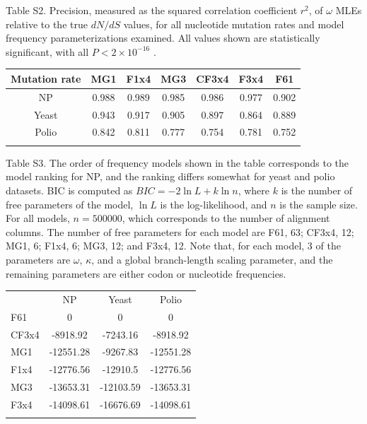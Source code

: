 \documentclass[11pt]{article}
\begin{document}
\noindent Table S2. Precision, measured as the squared correlation coefficient $r^2$, of $\omega$ MLEs relative to the true $dN/dS$ values, for all nucleotide mutation rates and model frequency parameterizations examined. All values shown are statistically significant, with all $P < 2\times10^{-16}$ .
\begin{table}[htbp]
	\begin{tabular}{c c c c c c c}
		\hline\noalign{\smallskip}
		Mutation rate & MG1 & F1x4 & MG3 & CF3x4 & F3x4 & F61 \\
		\hline\noalign{\smallskip}
		NP & 0.988 & 0.989 & 0.985 & 0.986 & 0.977 & 0.902 \\ 
		Yeast & 0.943 & 0.917 & 0.905 & 0.897 & 0.864 & 0.889 \\ 
		Polio & 0.842 & 0.811 & 0.777 & 0.754 & 0.781 & 0.752 \\ 
		\noalign{\smallskip}\hline\noalign{\smallskip}
	\end{tabular}
\end{table}	

\vspace{2.5cm}


\noindent Table S3. The order of frequency models shown in the table corresponds to the model ranking for NP, and the ranking differs somewhat for yeast and polio datasets. BIC is computed as $BIC = -2\ln L + k\ln n$, where $k$ is the number of free parameters of the model, $\ln L$ is the log-likelihood, and $n$ is the sample size. For all models, $n=500000$, which corresponds to the number of alignment columns. The number of free parameters for each model are F61, 63; CF3x4, 12; MG1, 6; F1x4, 6; MG3, 12; and F3x4, 12. Note that, for each model, 3 of the parameters are $\omega$, $\kappa$, and a global branch-length scaling parameter, and the remaining parameters are either codon or nucleotide frequencies.
\begin{table}[htbp]
	\begin{tabular}{l c c c}
		\hline\noalign{\smallskip}
		\multicolumn{1}{c}{Frequencies} & NP & Yeast & Polio \\
		\noalign{\smallskip}\hline\noalign{\smallskip}
		F61 & 0 & 0 & 0 \\ 
		CF3x4 & -8918.92 & -7243.16 & -8918.92 \\ 
		MG1 & -12551.28 & -9267.83 & -12551.28 \\ 
		F1x4 & -12776.56 & -12910.5 & -12776.56 \\ 
		MG3 & -13653.31 & -12103.59 & -13653.31 \\ 
		F3x4 & -14098.61 & -16676.69 & -14098.61 \\ 
		\noalign{\smallskip}\hline\noalign{\smallskip} 	
	\end{tabular}
\end{table}
\end{document}
